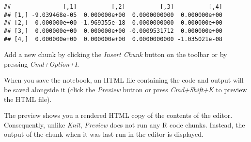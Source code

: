 \documentclass[
]{article}
\begin{document}
\begin{verbatim}
##               [,1]          [,2]          [,3]          [,4]
## [1,] -9.039468e-05  0.000000e+00  0.0000000000  0.000000e+00
## [2,]  0.000000e+00 -1.969355e-18  0.0000000000  0.000000e+00
## [3,]  0.000000e+00  0.000000e+00 -0.0009531712  0.000000e+00
## [4,]  0.000000e+00  0.000000e+00  0.0000000000 -1.035021e-08
\end{verbatim}

Add a new chunk by clicking the \emph{Insert Chunk} button on the
toolbar or by pressing \emph{Cmd+Option+I}.

When you save the notebook, an HTML file containing the code and output
will be saved alongside it (click the \emph{Preview} button or press
\emph{Cmd+Shift+K} to preview the HTML file).

The preview shows you a rendered HTML copy of the contents of the
editor. Consequently, unlike \emph{Knit}, \emph{Preview} does not run
any R code chunks. Instead, the output of the chunk when it was last run
in the editor is displayed.
\end{document}
